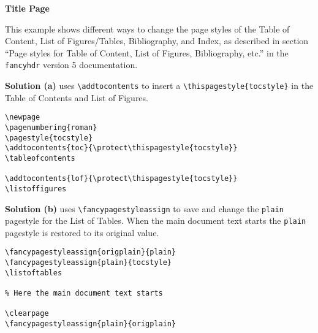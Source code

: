 \documentclass[a4paper,12pt,twoside]{report}
\begin{document}
\pagestyle{empty}
\begin{center}
  \Huge \textbf{Title Page}
\end{center}
\begin{boxedminipage}{\textwidth}
This example shows different ways to change the page styles of the Table of Content, List of Figures/Tables, Bibliography, and Index, as described in section ``Page styles for Table of Content, List of Figures, Bibliography, etc.'' in the \texttt{fancyhdr} version 5 documentation.

\raggedright\textbf{Solution (a)} uses \verb|\addtocontents| to insert a \verb|\thispagestyle{tocstyle}| in the Table of Contents and List of Figures.

\begin{verbatim}
\newpage
\pagenumbering{roman}
\pagestyle{tocstyle}
\addtocontents{toc}{\protect\thispagestyle{tocstyle}}
\tableofcontents

\addtocontents{lof}{\protect\thispagestyle{tocstyle}}
\listoffigures
\end{verbatim}
\end{boxedminipage}

\newpage
{}
\pagestyle{tocstyle}
\tableofcontents

\listoffigures

\bigskip

\begin{boxedminipage}{\textwidth}
\textbf{Solution (b)} uses \verb|\fancypagestyleassign| to save and change the \texttt{plain} pagestyle for the List of Tables. When the main document text starts the \texttt{plain} pagestyle is restored to its original value.

\begin{verbatim}
\fancypagestyleassign{origplain}{plain}
\fancypagestyleassign{plain}{tocstyle}
\listoftables  

% Here the main document text starts

\clearpage 
\fancypagestyleassign{plain}{origplain}
\end{verbatim}
\end{boxedminipage}

\listoftables  

\end{document}
